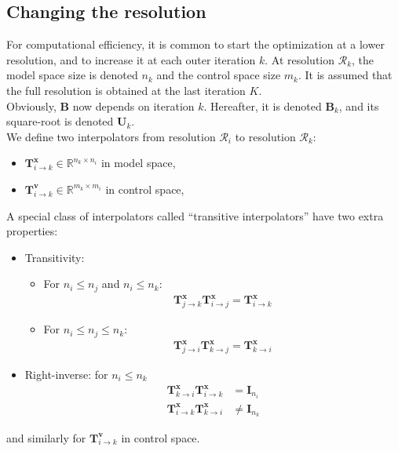 \documentclass[12pt]{scrartcl}
\begin{document}
\subsection{Changing the resolution}
For computational efficiency, it is common to start the optimization at a lower resolution, and to increase it at each outer iteration $k$. At resolution $\mathcal{R}_k$, the model space size is denoted $n_k$ and the control space size $m_k$. It is assumed that the full resolution is obtained at the last iteration $K$.\\

Obviously, $\mathbf{B}$ now depends on iteration $k$. Hereafter, it is denoted $\mathbf{B}_k$, and its square-root is denoted $\mathbf{U}_k$.\\

We define two interpolators from resolution $\mathcal{R}_i$ to resolution $\mathcal{R}_k$:
\begin{itemize}
\item $\mathbf{T}^\mathbf{x}_{i \rightarrow k} \in \mathbb{R}^{n_k \times n_i}$ in model space,
\item $\mathbf{T}^\mathbf{v}_{i \rightarrow k} \in \mathbb{R}^{m_k \times m_i}$ in control space,
\end{itemize}
$  $\\
A special class of interpolators called ``transitive interpolators'' have two extra properties:
\begin{itemize}
\item Transitivity:
\begin{itemize}
\item For $n_i \le n_j$ and $n_i \le n_k$:
\begin{align}
\mathbf{T}^\mathbf{x}_{j \rightarrow k} \mathbf{T}^\mathbf{x}_{i \rightarrow j} = \mathbf{T}^\mathbf{x}_{i \rightarrow k}
\end{align}
\item For $n_i \le n_j \le n_k$:
\begin{align}
\mathbf{T}^\mathbf{x}_{j \rightarrow i} \mathbf{T}^\mathbf{x}_{k \rightarrow j} = \mathbf{T}^\mathbf{x}_{k \rightarrow i}
\end{align}
\end{itemize}
\item Right-inverse: for $n_i \le n_k$
\begin{align}
\mathbf{T}^\mathbf{x}_{k \rightarrow i} \mathbf{T}^\mathbf{x}_{i \rightarrow k} & = \mathbf{I}_{n_i} \\
\mathbf{T}^\mathbf{x}_{i \rightarrow k} \mathbf{T}^\mathbf{x}_{k \rightarrow i} & \ne \mathbf{I}_{n_k}
\end{align}
\end{itemize}
and similarly for $\mathbf{T}^\mathbf{v}_{i \rightarrow k}$ in control space. 
\end{document}
